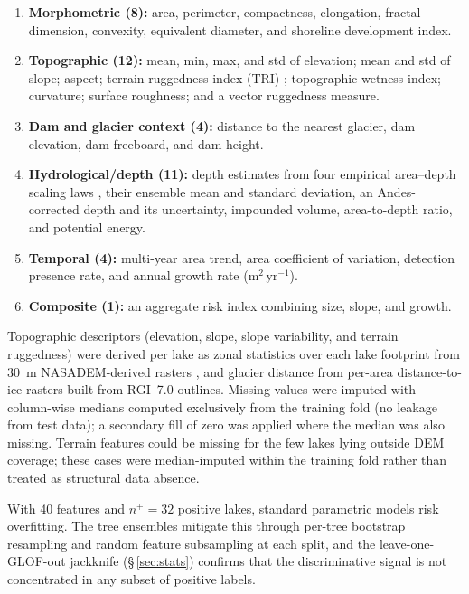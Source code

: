 \documentclass[pdflatex,sn-basic]{sn-jnl}%
\begin{document}
\begin{enumerate}
\item \textbf{Morphometric (8):} area, perimeter, compactness,
  elongation, fractal dimension, convexity, equivalent diameter,
  and shoreline development index.
\item \textbf{Topographic (12):} mean, min, max, and std of elevation;
  mean and std of slope; aspect; terrain ruggedness index (TRI)
  \citep{Riley1999}; topographic wetness index; curvature; surface
  roughness; and a vector ruggedness measure.
\item \textbf{Dam and glacier context (4):} distance to the nearest
  glacier, dam elevation, dam freeboard, and dam height.
\item \textbf{Hydrological/depth (11):} depth estimates from four
  empirical area--depth scaling laws
  \citep{Huggel2002,Yao2012,CookQuincey2015,OConnor2001}, their
  ensemble mean and standard deviation, an Andes-corrected depth and its
  uncertainty, impounded volume, area-to-depth ratio, and potential
  energy.
\item \textbf{Temporal (4):} multi-year area trend, area coefficient of
  variation, detection presence rate, and annual growth rate
  (m$^2$\,yr$^{-1}$).
\item \textbf{Composite (1):} an aggregate risk index combining size,
  slope, and growth.
\end{enumerate}

Topographic descriptors (elevation, slope, slope variability, and
terrain ruggedness) were derived per lake as zonal statistics over each
lake footprint from 30~m NASADEM-derived rasters \citep{NASADEM2020},
and glacier distance from per-area distance-to-ice rasters built from
RGI~7.0 outlines.
Missing values were imputed with column-wise medians computed
exclusively from the training fold (no leakage from test data);
a secondary fill of zero was applied where the median was also
missing. Terrain features could be missing for the few lakes lying outside
DEM coverage; these cases were median-imputed within the training fold
rather than treated as structural data absence.

With 40 features and $n^+\!=\!32$ positive lakes, standard parametric
models risk overfitting. The tree ensembles mitigate this through per-tree
bootstrap resampling and random feature subsampling at each split, and the
leave-one-GLOF-out jackknife (\S\,\ref{sec:stats}) confirms that the
discriminative signal is not concentrated in any subset of positive labels.
\end{document}
